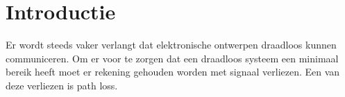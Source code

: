 \section{Introductie}

Er wordt steeds vaker verlangt dat elektronische ontwerpen draadloos kunnen communiceren. Om er voor te zorgen dat een draadloos systeem een minimaal bereik heeft moet er rekening gehouden worden met signaal verliezen. Een van deze verliezen is path loss. 


